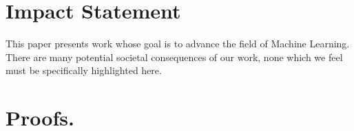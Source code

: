 \documentclass{article}
\theoremstyle{plain}
\theoremstyle{definition}
\theoremstyle{remark}
\begin{document}
\begin{abstract}
    Graph neural ordinary differential equations (Graph ODEs) extend graph learning from discrete message-passing layers to continuous-time representation flows. While it supports adaptive long-range propagation, we show that Graph ODEs with strictly positive irreducible mixing operators face an inherent \emph{monostability trap}: in the long-time regime, information leakage is unavoidable and the dynamics converge to a single global consensus attractor. We propose the \textbf{Hysteresis Graph ODE (HGODE)}, which couples feature evolution with a latent topological potential driven by a learned pairwise force. A double-well edge potential and bipolarized gate allow edge states to polarize into connected or insulated phases while preserving differentiability. We provide asymptotic analysis of the collapse mechanism and the proposed hysteretic topology dynamics, and validate HGODE on theory-driven synthetic diagnostics and real-world graph benchmarks.
\end{abstract}













\cleardoublepage
\section*{Impact Statement}
This paper presents work whose goal is to advance the field of Machine
Learning. There are many potential societal consequences of our work, none
which we feel must be specifically highlighted here.




\newpage
\appendix
\onecolumn
\section{Proofs.}
\label{sec:proofs}
\end{document}
